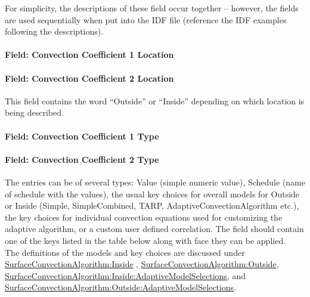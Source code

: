 For simplicity, the descriptions of these field occur together -- however, the fields are used sequentially when put into the IDF file (reference the IDF examples following the descriptions).

\paragraph{Field: Convection Coefficient 1 Location}\label{field-convection-coefficient-1-location-1}

\paragraph{Field: Convection Coefficient 2 Location}\label{field-convection-coefficient-2-location-1}

This field contains the word ``Outside'' or ``Inside'' depending on which location is being described.

\paragraph{Field: Convection Coefficient 1 Type}\label{field-convection-coefficient-1-type-1}

\paragraph{Field: Convection Coefficient 2 Type}\label{field-convection-coefficient-2-type-1}

The entries can be of several types: Value (simple numeric value), Schedule (name of schedule with the values), the usual key choices for overall models for Outside or Inside (Simple, SimpleCombined, TARP, AdaptiveConvectionAlgorithm etc.), the key choices for individual convection equations used for customizing the adaptive algorithm, or a custom user defined correlation. The field should contain one of the keys listed in the table below along with face they can be applied.~ The definitions of the models and key choices are discussed under \hyperref[surfaceconvectionalgorithminside]{SurfaceConvectionAlgorithm:Inside} , \hyperref[surfaceconvectionalgorithmoutside]{SurfaceConvectionAlgorithm:Outside}, \hyperref[surfaceconvectionalgorithminsideadaptivemodelselections]{SurfaceConvectionAlgorithm:Inside:AdaptiveModelSelections}, and \hyperref[surfaceconvectionalgorithmoutsideadaptivemodelselections]{SurfaceConvectionAlgorithm:Outside:AdaptiveModelSelections}.


